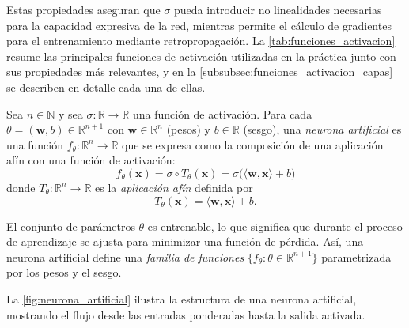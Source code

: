 Estas propiedades aseguran que $\sigma$ pueda introducir no linealidades necesarias para la capacidad expresiva de la red, mientras permite el cálculo de gradientes para el entrenamiento mediante retropropagación. La \autoref{tab:funciones_activacion} resume las principales funciones de activación utilizadas en la práctica junto con sus propiedades más relevantes, y en la \autoref{subsubsec:funciones_activacion_capas} se describen en detalle cada una de ellas.

\begin{definition}\label{def:neurona_artificial}
	Sea $n \in \mathbb{N}$ y sea $\sigma: \mathbb{R} \to \mathbb{R}$ una función de activación. Para cada $\theta = (\mathbf{w}, b) \in \mathbb{R}^{n+1}$ con $\mathbf{w} \in \mathbb{R}^n$ (pesos) y $b \in \mathbb{R}$ (sesgo), una \textit{neurona artificial} es una función $f_{\theta}: \mathbb{R}^n \to \mathbb{R}$ que se expresa como la composición de una aplicación afín con una función de activación:
	\begin{equation}
		f_{\theta}(\mathbf{x}) = \sigma \circ T_{\theta}(\mathbf{x}) = \sigma\Big( \langle \mathbf{w}, \mathbf{x} \rangle + b \Big)
		\label{eq:neuron_formal}
	\end{equation}
	donde $T_{\theta}: \mathbb{R}^n \to \mathbb{R}$ es la \textit{aplicación afín} definida por
	\[
	T_{\theta}(\mathbf{x}) = \langle \mathbf{w}, \mathbf{x} \rangle + b.
	\]
\end{definition}

El conjunto de parámetros $\theta$ es entrenable, lo que significa que durante el proceso de aprendizaje se ajusta para minimizar una función de pérdida. Así, una neurona artificial define una \textit{familia de funciones} $\{f_{\theta} : \theta \in \mathbb{R}^{n+1}\}$ parametrizada por los pesos y el sesgo.

La \autoref{fig:neurona_artificial} ilustra la estructura de una neurona artificial, mostrando el flujo desde las entradas ponderadas hasta la salida activada.

